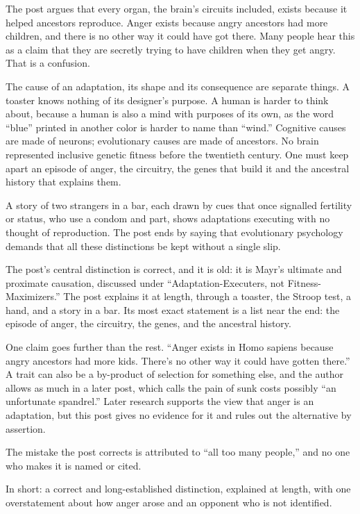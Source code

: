 \begin{afterword}
\summaryhead

The post argues that every organ, the brain's circuits included, exists because it helped ancestors reproduce. Anger exists because angry ancestors had more children, and there is no other way it could have got there. Many people hear this as a claim that they are secretly trying to have children when they get angry. That is a confusion.

The cause of an adaptation, its shape and its consequence are separate things. A toaster knows nothing of its designer's purpose. A human is harder to think about, because a human is also a mind with purposes of its own, as the word ``blue'' printed in another color is harder to name than ``wind.'' Cognitive causes are made of neurons; evolutionary causes are made of ancestors. No brain represented inclusive genetic fitness before the twentieth century. One must keep apart an episode of anger, the circuitry, the genes that build it and the ancestral history that explains them.

A story of two strangers in a bar, each drawn by cues that once signalled fertility or status, who use a condom and part, shows adaptations executing with no thought of reproduction. The post ends by saying that evolutionary psychology demands that all these distinctions be kept without a single slip.

\responsehead

The post's central distinction is correct, and it is old: it is Mayr's ultimate and proximate causation, discussed under ``Adaptation-Executers, not Fitness-Maximizers.'' The post explains it at length, through a toaster, the Stroop test, a hand, and a story in a bar. Its most exact statement is a list near the end: the episode of anger, the circuitry, the genes, and the ancestral history.

One claim goes further than the rest. ``Anger exists in Homo sapiens because angry ancestors had more kids. There's no other way it could have gotten there.'' A trait can also be a by-product of selection for something else, and the author allows as much in a later post, which calls the pain of sunk costs possibly ``an unfortunate spandrel.'' Later research supports the view that anger is an adaptation, but this post gives no evidence for it and rules out the alternative by assertion.

The mistake the post corrects is attributed to ``all too many people,'' and no one who makes it is named or cited.

In short: a correct and long-established distinction, explained at length, with one overstatement about how anger arose and an opponent who is not identified.
\end{afterword}
